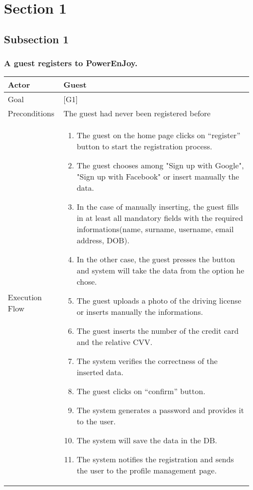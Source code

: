 \documentclass{article}
\begin{document}
	\section{Section 1}
	\subsection{Subsection 1}

	\subsubsection{A guest registers to PowerEnJoy.}
	\begin{tabularx}{\textwidth}{  l  X  }
		\hline
		Actor & Guest\\
		\hline
		Goal & [G1]\\
		\hline
		Preconditions & The guest had never been registered before\\
		\hline
		Execution Flow & \begin{enumerate}
                     \item{The guest on the home page clicks on “register” button to start the registration process.}
                     \item{The guest chooses among "Sign up with Google", "Sign up with Facebook" or insert manually the data.}
						 				 \item{In the case of manually inserting, the guest fills in at least all mandatory fields with the required informations(name, surname, username, email address, DOB).}
                     \item{In the other case, the guest presses the button and system will take the data from the option he chose.}
                     \item{The guest uploads a photo of the driving license or inserts manually the informations.}
										 \item{The guest inserts the number of the credit card and the relative CVV}.
						  		 	 \item{The system verifies the correctness of the inserted data.}
						 			 	 \item{The guest clicks on “confirm” button.}
						 			 	 \item{The system generates a password and provides it to the user.}
						 			 	 \item{The system will save the data in the DB.}
						 			 	 \item{The system notifies the registration and sends the user to the profile management page.}

\end{enumerate}
\end{tabularx}
\end{document}
